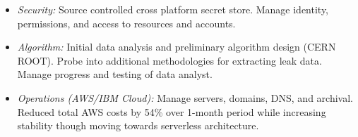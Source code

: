 {{\begin{itemize}
      \item \emph{Security:}
        Source controlled cross platform secret store. Manage identity, permissions, and access to resources and accounts.
      \item \emph{Algorithm:}
        Initial data analysis and preliminary algorithm design (CERN ROOT). Probe into additional methodologies for extracting leak data. Manage progress and testing of data analyst. 
      \item \emph{Operations (AWS/IBM Cloud):}
        Manage servers, domains, DNS, and archival. Reduced total AWS costs by 54\% over 1-month period while increasing stability though moving towards serverless architecture.
    \end{itemize}
    }
}

